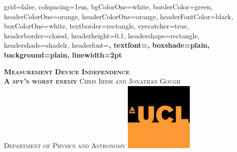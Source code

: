 \documentclass[portrait,final,archA0,fontscale=0.3]{baposter}
\begin{document}

\begin{poster}%
  {
  grid=false,
  colspacing=1em,
  bgColorOne=white,
  borderColor=green,
  headerColorOne=orange,
  headerColorOne=orange,
  headerFontColor=black,
  boxColorOne=white,
  textborder=rectangle,
  eyecatcher=true,
  headerborder=closed,
  headerheight=0.1\textheight,
  headershape=rectangle,
  headershade=shadelr,
  headerfont=\Large\bf\textsc, %
  textfont={\setlength{\parindent}{1.5em}},
  boxshade=plain,
  background=plain,
  linewidth=2pt
  }
  {\begin{minipage}{8em}
   \hfill\vspace{1in}
  \end{minipage} } %
  {\bf \textsc{  Measurement Device Independence \\ A spy's worst enemy  } }
  {\textsc{  Chris Irish and Jonathan Gough \\ Department of Physics and Astronomy}}
  {%
    \includegraphics[height=9.0em]{img/ucl_logo}
  }

    \newcommand{\colouredcircle}{%
      \tikz{\useasboundingbox (-0.2em,-0.32em) rectangle(0.2em,0.32em); \draw[draw=black,fill=lightblue,line width=0.03em] (0,0) circle(0.18em);}}


\end{poster}
\end{document}
